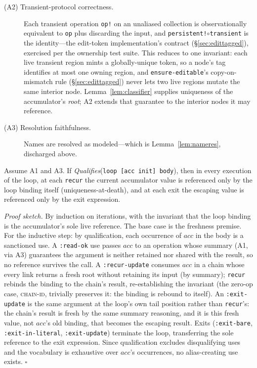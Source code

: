 \documentclass[sigplan,review,anonymous]{acmart}
\begin{document}
\begin{description}
    \item[(A2) Transient-protocol correctness.] Each transient operation \texttt{op!} on an unaliased collection is observationally equivalent to \texttt{op} plus discarding the input, and \texttt{persistent!}$\circ$\texttt{transient} is the identity---the edit-token implementation's contract (§\ref{sec:edittagged}), exercised per the ownership test suite. This reduces to one invariant: each live transient region mints a globally-unique token, so a node's tag identifies at most one owning region, and \texttt{ensure-editable}'s copy-on-mismatch rule (§\ref{sec:edittagged}) never lets two live regions mutate the same interior node. Lemma~\ref{lem:classifier} supplies uniqueness of the accumulator's \emph{root}; A2 extends that guarantee to the interior nodes it may reference.
    \item[(A3) Resolution faithfulness.] Names are resolved as modeled---which is Lemma~\ref{lem:nameres}, discharged above.
\end{description}

\begin{lemma}
\label{lem:classifier}
Assume A1 and A3. If \emph{Qualifies}(\texttt{loop [acc init] body}), then in every execution of the loop, at each \texttt{recur} the current accumulator value is referenced only by the loop binding itself (uniqueness-at-death), and at each exit the escaping value is referenced only by the exit expression.
\end{lemma}

\emph{Proof sketch.} By induction on iterations, with the invariant that the loop binding is the accumulator's sole live reference. The base case is the freshness premise. For the inductive step: by qualification, each occurrence of $acc$ in the body is a sanctioned use. A \texttt{:read-ok} use passes $acc$ to an operation whose summary (A1, via A3) guarantees the argument is neither retained nor shared with the result, so no reference survives the call. A \texttt{:recur-update} consumes $acc$ in a chain whose every link returns a fresh root without retaining its input (by summary); \texttt{recur} rebinds the binding to the chain's result, re-establishing the invariant (the zero-op case, \textsc{chain-id}, trivially preserves it: the binding is rebound to itself). An \texttt{:exit-update} is the same argument at the loop's own tail position rather than \texttt{recur}'s: the chain's result is fresh by the same summary reasoning, and it is this fresh value, not $acc$'s old binding, that becomes the escaping result. Exits (\texttt{:exit-bare}, \texttt{:exit-in-literal}, \texttt{:exit-update}) terminate the loop, transferring the sole reference to the exit expression. Since qualification excludes disqualifying uses and the vocabulary is exhaustive over $acc$'s occurrences, no alias-creating use exists. $\square$
\end{document}
